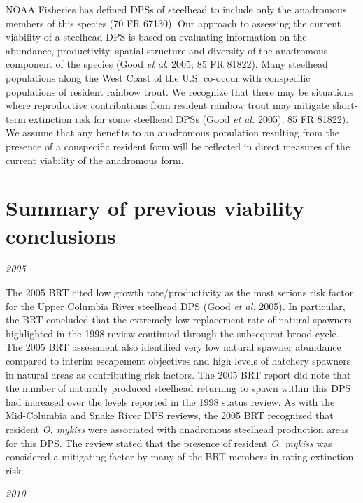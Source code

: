 \documentclass[
  letterpaper,
  oneside,
  open=any]{scrbook}
\begin{document}
NOAA Fisheries has defined DPSs of steelhead to include only the
anadromous members of this species (70 FR 67130). Our approach to
assessing the current viability of a steelhead DPS is based on
evaluating information on the abundance, productivity, spatial structure
and diversity of the anadromous component of the species (Good \emph{et
al}. 2005; 85 FR 81822). Many steelhead populations along the West Coast
of the U.S. co-occur with conspecific populations of resident rainbow
trout. We recognize that there may be situations where reproductive
contributions from resident rainbow trout may mitigate short-term
extinction risk for some steelhead DPSs (Good \emph{et al.} 2005); 85 FR
81822). We assume that any benefits to an anadromous population
resulting from the presence of a conspecific resident form will be
reflected in direct measures of the current viability of the anadromous
form.

\hypertarget{summary-of-previous-viability-conclusions}{%
\section{Summary of previous viability
conclusions}\label{summary-of-previous-viability-conclusions}}

\emph{2005}

The 2005 BRT cited low growth rate/productivity as the most serious risk
factor for the Upper Columbia River steelhead DPS (Good \emph{et al.}
2005). In particular, the BRT concluded that the extremely low
replacement rate of natural spawners highlighted in the 1998 review
continued through the subsequent brood cycle. The 2005 BRT assessment
also identified very low natural spawner abundance compared to interim
escapement objectives and high levels of hatchery spawners in natural
areas as contributing risk factors. The 2005 BRT report did note that
the number of naturally produced steelhead returning to spawn within
this DPS had increased over the levels reported in the 1998 status
review. As with the Mid-Columbia and Snake River DPS reviews, the 2005
BRT recognized that resident \emph{O. mykiss} were associated with
anadromous steelhead production areas for this DPS. The review stated
that the presence of resident \emph{O. mykiss} was considered a
mitigating factor by many of the BRT members in rating extinction risk.

\emph{2010}
\end{document}
